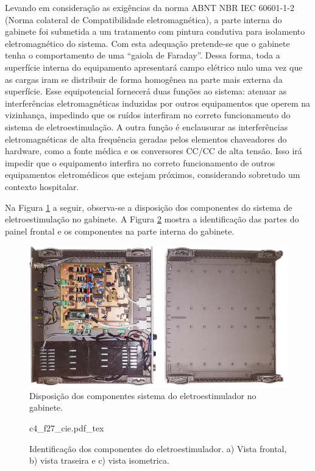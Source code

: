 Levando em consideração as exigências da norma \acrshort{ABNT} \acrshort{NBR} \acrshort{IEC} 60601-1-2 (Norma colateral de Compatibilidade eletromagnética), a parte interna do gabinete foi submetida a um tratamento com pintura condutiva para isolamento eletromagnético do sistema. Com esta adequação pretende-se que o gabinete tenha o comportamento de uma “gaiola de Faraday”. Dessa forma, toda a superfície interna do equipamento apresentará campo elétrico nulo uma vez que as cargas iram se distribuir de forma homogênea na parte mais externa da superfície. Esse equipotencial fornecerá duas funções ao sistema: atenuar as interferências eletromagnéticas induzidas por outros equipamentos que operem na vizinhança, impedindo que os ruídos interfiram no correto funcionamento do sistema de eletroestimulação. A outra função é enclausurar as interferências eletromagnéticas de alta frequência geradas pelos elementos chaveadores do hardware, como a fonte médica e os conversores CC/CC de alta tensão. Isso irá impedir que o equipamento interfira no correto funcionamento de outros equipamentos eletromédicos que estejam próximos, considerando sobretudo um contexto hospitalar.

Na Figura \ref{fig:c4_f26_dcgp} a seguir, observa-se a disposição dos componentes do sistema de eletroestimulação no gabinete. A Figura \ref{fig:c4_f27_mpci} mostra a identificação das partes do painel frontal e os componentes na parte interna do gabinete.

\begin{figure}
    \centering %
    \includegraphics[width=0.9\linewidth]{figs/Fig_c4/c4_f26_dcgp}
    \caption{Disposição dos componentes sistema do eletroestimulador no gabinete.}
    \label{fig:c4_f26_dcgp}
\end{figure}

\begin{figure}
    \centering %
    \small %
    \def\svgwidth{1\columnwidth}%
    {c4_f27_cie.pdf_tex}
    \caption{Identificação dos componentes do eletroestimulador. a) Vista frontal, b) vista traseira e c) vista isometrica.}
    \label{fig:c4_f27_mpci}
\end{figure}


